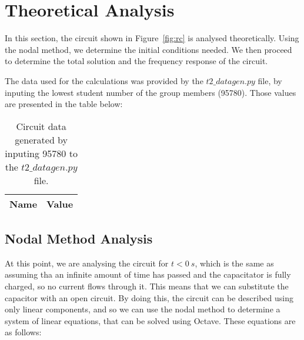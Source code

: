 \section{Theoretical Analysis}
\label{sec:analysis}

In this section, the circuit shown in Figure~\ref{fig:rc} is analysed
theoretically. Using the nodal method, we determine the initial conditions needed. We then proceed to determine the total solution and the frequency response of the circuit.

The data used for the calculations was provided by the $t2\_datagen.py$ file, by inputing the lowest student number of the group members (95780). Those values are presented in the table below:

\begin{table}[h]
  \centering
  \begin{tabular}{|l|r|}
    \hline
    {\bf Name} & {\bf Value} \\ \hline
    
  \end{tabular}
  \caption{Circuit data generated by inputing 95780 to the $t2\_datagen.py$ file.}                                                            
  \label{tab:data}                                                      
\end{table}   


\subsection{Nodal Method Analysis}

At this point, we are analysing the circuit for $t<0~s$, which is the same as assuming tha an infinite amount of time has passed and the capacitator is fully charged, so no current flows through it. This means that we can substitute the capacitor with an open circuit. By doing this, the circuit can be described using only linear components, and so we can use the nodal method to determine a system of linear equations, that can be solved using Octave. These equations are as follows: 



